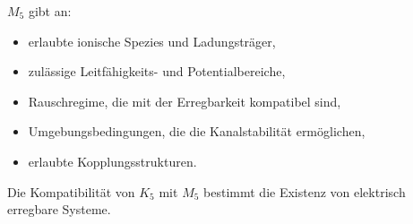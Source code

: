 $M_5$ gibt an:
\begin{itemize}
    \item erlaubte ionische Spezies und Ladungsträger,
    \item zulässige Leitfähigkeits- und Potentialbereiche,
    \item Rauschregime, die mit der Erregbarkeit kompatibel sind,
    \item Umgebungsbedingungen, die die Kanalstabilität ermöglichen,
    \item erlaubte Kopplungsstrukturen.
\end{itemize}

Die Kompatibilität von $K_5$ mit $M_5$ bestimmt die Existenz von
elektrisch erregbare Systeme.
